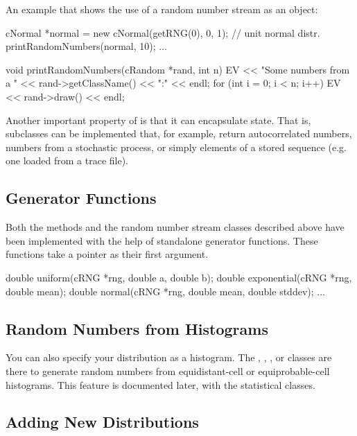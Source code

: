 An example that shows the use of a random number stream as an object:

\begin{cpp}
cNormal *normal = new cNormal(getRNG(0), 0, 1); // unit normal distr.
printRandomNumbers(normal, 10);
...

void printRandomNumbers(cRandom *rand, int n)
{
    EV << "Some numbers from a " << rand->getClassName() << ":" << endl;
    for (int i = 0; i < n; i++)
        EV << rand->draw() << endl;
}
\end{cpp}

Another important property of  is that it can encapsulate
state. That is, subclasses can be implemented that, for example, return
autocorrelated numbers, numbers from a stochastic process, or simply
elements of a stored sequence (e.g. one loaded from a trace file).

\subsection{Generator Functions}
\label{sec:sim-lib:random-variate-generator-functions}

Both the  methods and the random number stream classes
described above have been implemented with the help of standalone generator
functions. These functions take a  pointer as their first
argument.

\begin{cpp}
double uniform(cRNG *rng, double a, double b);
double exponential(cRNG *rng, double mean);
double normal(cRNG *rng, double mean, double stddev);
...
\end{cpp}

\subsection{Random Numbers from Histograms}
\label{sec:sim-lib:random-numbers-from-histograms}

You can also specify your distribution as a
histogram. The
, ,
,  or  classes
are there to generate random numbers from equi\-dis\-tant-cell or
equiprobable-cell histograms.  This feature is documented later, with
the statistical classes.

\subsection{Adding New Distributions}
\label{sec:sim-lib:adding-new-distributions}

